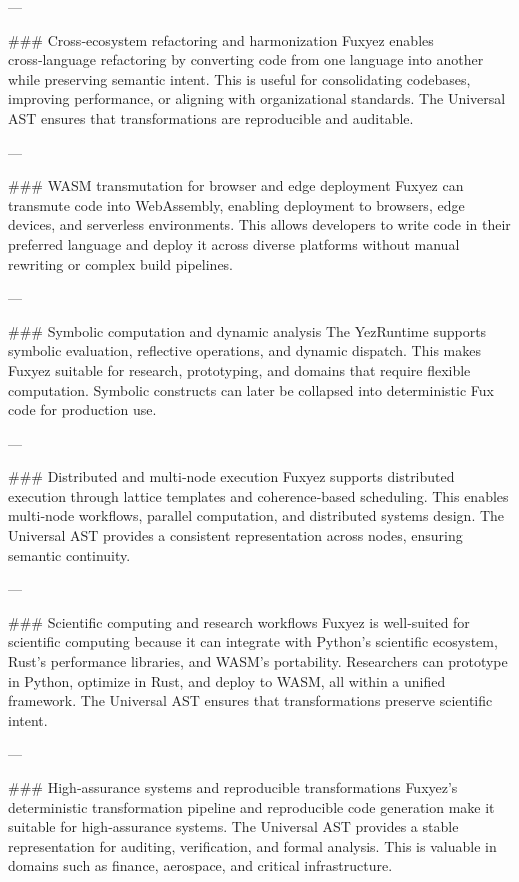 \documentclass[12pt, a4paper]{book}
\begin{document}
---

\#\#\# Cross‑ecosystem refactoring and harmonization  
Fuxyez enables cross‑language refactoring by converting code from one language into another while preserving semantic intent. This is useful for consolidating codebases, improving performance, or aligning with organizational standards. The Universal AST ensures that transformations are reproducible and auditable.

---

\#\#\# WASM transmutation for browser and edge deployment  
Fuxyez can transmute code into WebAssembly, enabling deployment to browsers, edge devices, and serverless environments. This allows developers to write code in their preferred language and deploy it across diverse platforms without manual rewriting or complex build pipelines.

---

\#\#\# Symbolic computation and dynamic analysis  
The YezRuntime supports symbolic evaluation, reflective operations, and dynamic dispatch. This makes Fuxyez suitable for research, prototyping, and domains that require flexible computation. Symbolic constructs can later be collapsed into deterministic Fux code for production use.

---

\#\#\# Distributed and multi‑node execution  
Fuxyez supports distributed execution through lattice templates and coherence‑based scheduling. This enables multi‑node workflows, parallel computation, and distributed systems design. The Universal AST provides a consistent representation across nodes, ensuring semantic continuity.

---

\#\#\# Scientific computing and research workflows  
Fuxyez is well‑suited for scientific computing because it can integrate with Python’s scientific ecosystem, Rust’s performance libraries, and WASM’s portability. Researchers can prototype in Python, optimize in Rust, and deploy to WASM, all within a unified framework. The Universal AST ensures that transformations preserve scientific intent.

---

\#\#\# High‑assurance systems and reproducible transformations  
Fuxyez’s deterministic transformation pipeline and reproducible code generation make it suitable for high‑assurance systems. The Universal AST provides a stable representation for auditing, verification, and formal analysis. This is valuable in domains such as finance, aerospace, and critical infrastructure.
\end{document}
